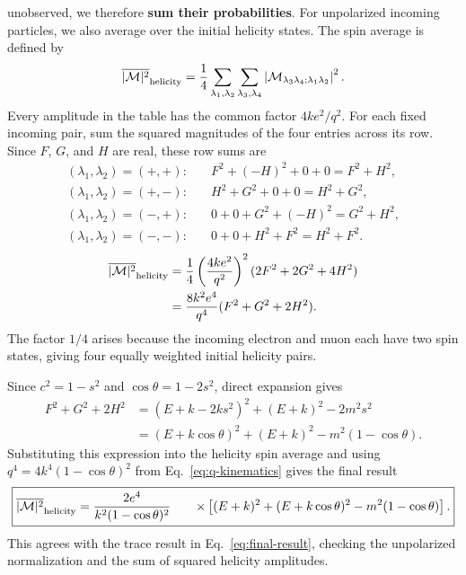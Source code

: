 \documentclass[12pt,a4paper]{article}
\numberwithin{equation}{section}
\newcommand{\M}{\mathcal M}
\begin{document}
unobserved, we therefore \textbf{sum their probabilities}. For unpolarized
incoming particles, we also average over the initial helicity states.
The spin average is defined by
\begin{equation}
 \overline{|\M|^2}_{\rm helicity}
 =\frac14\sum_{\lambda_1,\lambda_2}\sum_{\lambda_3,\lambda_4}
 \left|\M_{\lambda_3\lambda_4;\lambda_1\lambda_2}\right|^2.
\end{equation}
Every amplitude in the table has the common factor $4ke^2/q^2$.
For each fixed incoming pair, sum the squared magnitudes of the four
entries across its row. Since $F$, $G$, and $H$ are real, these row sums are
\begin{align}
 (\lambda_1,\lambda_2)=(+,+):\quad
 &F^2+(-H)^2+0+0=F^2+H^2,\\
 (\lambda_1,\lambda_2)=(+,-):\quad
 &H^2+G^2+0+0=H^2+G^2,\\
 (\lambda_1,\lambda_2)=(-,+):\quad
 &0+0+G^2+(-H)^2=G^2+H^2,\\
 (\lambda_1,\lambda_2)=(-,-):\quad
 &0+0+H^2+F^2=H^2+F^2.
\end{align}
\begin{align}
 \overline{|\M|^2}_{\rm helicity}
 &=\frac14\left(\frac{4ke^2}{q^2}\right)^2
       (2F^2+2G^2+4H^2)\\
 &=\frac{8k^2e^4}{q^4}(F^2+G^2+2H^2).
\end{align}
The factor $1/4$ arises because the incoming electron and muon each have
two spin states, giving four equally weighted initial helicity pairs.

Since $c^2=1-s^2$ and $\cos\theta=1-2s^2$, direct expansion gives
\begin{align}
 F^2+G^2+2H^2
 &=(E+k-2ks^2)^2+(E+k)^2-2m^2s^2\\
 &=(E+k\cos\theta)^2+(E+k)^2
       -m^2(1-\cos\theta).
\end{align}
Substituting this expression into the helicity spin average and using
$q^4=4k^4(1-\cos\theta)^2$ from Eq.~\eqref{eq:q-kinematics} gives the final result
\begin{equation}
 \boxed{\begin{aligned}
 \overline{|\M|^2}_{\rm helicity}
 &=\frac{2e^4}{k^2(1-\cos\theta)^2}
 &\quad\times\left[(E+k)^2+(E+k\cos\theta)^2
             -m^2(1-\cos\theta)\right].
 \end{aligned}}
 \label{eq:helicity-final-result}
\end{equation}
This agrees with the trace result in Eq.~\eqref{eq:final-result}, checking
the unpolarized normalization and the sum of squared helicity amplitudes.
\end{document}
